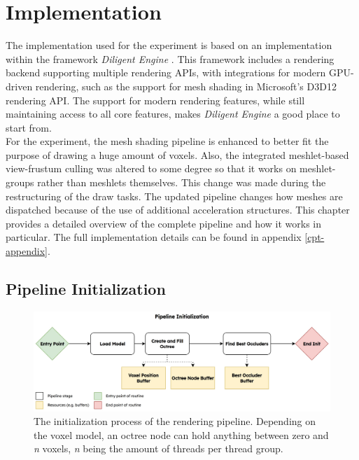 \chapter{Implementation} \label{cpt-implementation}

The implementation used for the experiment is based on an implementation within the framework \emph{Diligent Engine} 
\cite{DiligentGraphicsGitHub, DiligentGraphics}. This framework includes a rendering backend supporting 
multiple rendering \ac{API}s, with integrations for modern \ac{GPU}-driven rendering, such as the support for 
mesh shading in Microsoft's D3D12 rendering \ac{API}. The support for modern rendering features, while still 
maintaining access to all core features, makes \emph{Diligent Engine} a good place to start from.\\

\noindent
For the experiment, the mesh shading pipeline is enhanced to better fit the purpose of drawing a huge amount of voxels. 
Also, the integrated meshlet-based view-frustum culling was altered to some degree so that it works on meshlet-groups 
rather than meshlets themselves. This change was made during the restructuring of the draw tasks. The updated pipeline 
changes how meshes are dispatched because of the use of additional acceleration structures. This chapter provides 
a detailed overview of the complete pipeline and how it works in particular. The full implementation details can be 
found in appendix \ref{cpt-appendix}.

\section{Pipeline Initialization} \label{sec-piepline-initialization}

\begin{figure}[h]
    \centering
    \includegraphics[width=\linewidth]{images/graphics/pipeline-initialization.jpg}
    \caption{The initialization process of the rendering pipeline. Depending on the voxel model, an octree node 
    can hold anything between zero and \emph{n} voxels, \emph{n} being the amount of threads per thread group.}
    \label{fig:pipeline-initialization}
\end{figure}

